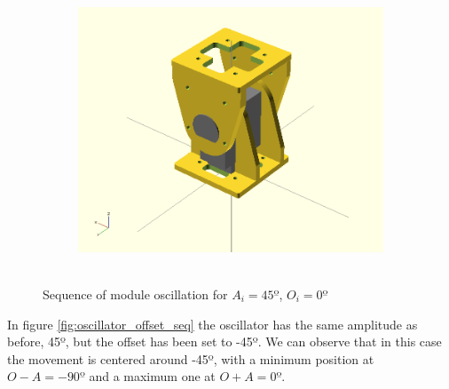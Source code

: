 \begin{figure}[h]
\begin{subfigure}[b]{0.18\textwidth}
                 ~
                \label{fig:Gait_osc_center_62_5-3}
        \end{subfigure}
        ~
        \begin{subfigure}[b]{0.18\textwidth}
         	   \centering
                \includegraphics[width=\textwidth]{images/Gait_osc_center_90.png}
                 ~
                \label{fig:Gait_osc_center_90-3}
        \end{subfigure}
        \caption{Sequence of module oscillation for $A_i = 45º$, $O_i = 0º$}\label{fig:oscillator_center_seq}
\end{figure}

In figure \ref{fig:oscillator_offset_seq} the oscillator has the same amplitude as before, 45º, but the offset has been set to -45º. We can observe that in this case the movement is centered around -45º, with a minimum position at  $ O - A = -90º$ and a maximum one at $O + A = 0º$.\\

